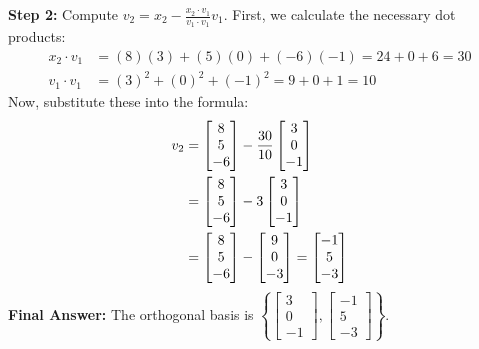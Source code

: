 \documentclass[11pt, letterpaper]{article}
\theoremstyle{definition}
\theoremstyle{remark}
\begin{document}
\textbf{Step 2:} Compute $v_2 = x_2 - \frac{x_2 \cdot v_1}{v_1 \cdot v_1}v_1$.
First, we calculate the necessary dot products:
\begin{align*}
    x_2 \cdot v_1 &= (8)(3) + (5)(0) + (-6)(-1) = 24 + 0 + 6 = 30 \\
    v_1 \cdot v_1 &= (3)^2 + (0)^2 + (-1)^2 = 9 + 0 + 1 = 10
\end{align*}
Now, substitute these into the formula:
\begin{align*}
    v_2 &= \begin{bmatrix} 8 \\ 5 \\ -6 \end{bmatrix} - \frac{30}{10} \begin{bmatrix} 3 \\ 0 \\ -1 \end{bmatrix} \\ \relax
    &= \begin{bmatrix} 8 \\ 5 \\ -6 \end{bmatrix} - 3 \begin{bmatrix} 3 \\ 0 \\ -1 \end{bmatrix} \\ \relax
    &= \begin{bmatrix} 8 \\ 5 \\ -6 \end{bmatrix} - \begin{bmatrix} 9 \\ 0 \\ -3 \end{bmatrix} = \begin{bmatrix} -1 \\ 5 \\ -3 \end{bmatrix}
\end{align*}
\textbf{Final Answer:} The orthogonal basis is $\left\{ \begin{bmatrix} 3 \\ 0 \\ -1 \end{bmatrix}, \begin{bmatrix} -1 \\ 5 \\ -3 \end{bmatrix} \right\}$.
\end{document}

